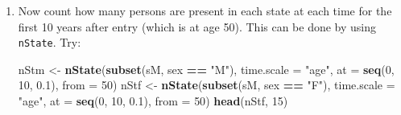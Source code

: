 \documentclass[
]{book}
\newenvironment{Shaded}{\begin{snugshade}}{\end{snugshade}}
\newcommand{\AttributeTok}[1]{\textcolor[rgb]{0.13,0.29,0.53}{#1}}
\newcommand{\DecValTok}[1]{\textcolor[rgb]{0.00,0.00,0.81}{#1}}
\newcommand{\FloatTok}[1]{\textcolor[rgb]{0.00,0.00,0.81}{#1}}
\newcommand{\FunctionTok}[1]{\textcolor[rgb]{0.13,0.29,0.53}{\textbf{#1}}}
\newcommand{\NormalTok}[1]{#1}
\newcommand{\OtherTok}[1]{\textcolor[rgb]{0.56,0.35,0.01}{#1}}
\newcommand{\SpecialCharTok}[1]{\textcolor[rgb]{0.81,0.36,0.00}{\textbf{#1}}}
\newcommand{\StringTok}[1]{\textcolor[rgb]{0.31,0.60,0.02}{#1}}
\begin{document}
\begin{enumerate}
\begin{Shaded}
\begin{Highlighting}[]
\FunctionTok{summary}\NormalTok{(sM, }\AttributeTok{by =} \StringTok{"sex"}\NormalTok{)}
\end{Highlighting}
\end{Shaded}

\begin{Shaded}
\begin{Highlighting}[]
\NormalTok{$M}

\NormalTok{Transitions:}
\NormalTok{     To}
\NormalTok{From  NRA Rem ESRD ESRD(Rem) Records: Events: Risk time: Persons:}
\NormalTok{  NRA  30  72  398         0      500     470       2721      500}
\NormalTok{  Rem   0  35    0        37       72      37        415       72}
\NormalTok{  Sum  30 107  398        37      572     507       3136      500}

\NormalTok{$F}

\NormalTok{Transitions:}
\NormalTok{     To}
\NormalTok{From  NRA Rem ESRD ESRD(Rem) Records: Events: Risk time: Persons:}
\NormalTok{  NRA  32 143  325         0      500     468       2358      500}
\NormalTok{  Rem   0  89    0        54      143      54       1023      143}
\NormalTok{  Sum  32 232  325        54      643     522       3380      500}
\end{Highlighting}
\end{Shaded}

  Why are there so many ESRD-events in the resulting data set?
\item
  Now count how many persons are present in each state
  at each time for the first 10 years after entry (which is at age 50). This
  can be done by using \texttt{nState}. Try:

\begin{Shaded}
\begin{Highlighting}[]
\NormalTok{nStm }\OtherTok{\textless{}{-}} \FunctionTok{nState}\NormalTok{(}\FunctionTok{subset}\NormalTok{(sM, sex }\SpecialCharTok{==} \StringTok{"M"}\NormalTok{), }\AttributeTok{time.scale =} \StringTok{"age"}\NormalTok{, }
               \AttributeTok{at =} \FunctionTok{seq}\NormalTok{(}\DecValTok{0}\NormalTok{, }\DecValTok{10}\NormalTok{, }\FloatTok{0.1}\NormalTok{), }
             \AttributeTok{from =} \DecValTok{50}\NormalTok{)}
\NormalTok{nStf }\OtherTok{\textless{}{-}} \FunctionTok{nState}\NormalTok{(}\FunctionTok{subset}\NormalTok{(sM, sex }\SpecialCharTok{==} \StringTok{"F"}\NormalTok{), }\AttributeTok{time.scale =} \StringTok{"age"}\NormalTok{, }
               \AttributeTok{at =} \FunctionTok{seq}\NormalTok{(}\DecValTok{0}\NormalTok{, }\DecValTok{10}\NormalTok{, }\FloatTok{0.1}\NormalTok{), }
             \AttributeTok{from =} \DecValTok{50}\NormalTok{)}
\FunctionTok{head}\NormalTok{(nStf, }\DecValTok{15}\NormalTok{)}
\end{Highlighting}
\end{Shaded}


\end{enumerate}
\end{document}
